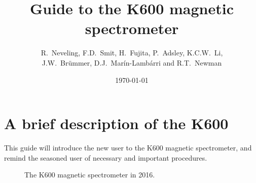 \documentclass[11pt]{report}
\begin{document}

\title{Guide to the K600 magnetic spectrometer}
\date{\today}
\author{R.~Neveling, F.D.~Smit, H.~Fujita, P.~Adsley, K.C.W.~Li, \\
J.W.~Br\"ummer, D.J.~Mar\'in-Lamb\'arri and R.T.~Newman}
\maketitle



\newpage
\tableofcontents 
\newpage
\chapter{A brief description of the K600}

This guide will introduce the new user to the K600 magnetic spectrometer,
and remind the seasoned user of necessary and important procedures.

\begin{figure}[!h]
\centerline{\vspace{0cm}\hspace{0cm}
}
\centering
\caption{The K600 magnetic spectrometer in 2016.}
\label{fig:k600}
\end{figure} 

\newpage
\end{document}
